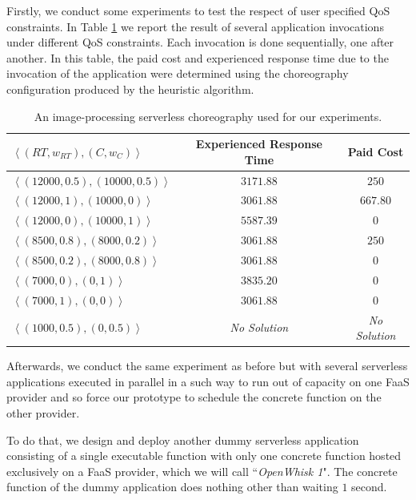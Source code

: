 \documentclass[12pt,a4paper]{report}
\newcommand{\ItalicQuotMark}[1]{``\textit{#1}"}
\begin{document}
Firstly, we conduct some experiments to test the respect of user specified QoS constraints. In Table \ref{tableTestQoS} we report the result of several application invocations under different QoS constraints. Each invocation is done sequentially, one after another. In this table, the paid cost and experienced response time due to the invocation of the application were determined using the choreography configuration produced by the heuristic algorithm.

\begin{table}
	\centering
	\begin{tabular}{l | c | c} 
		\toprule
		$\left\langle (RT,w_{RT}),(C,w_{C}) \right\rangle$ & Experienced Response Time & Paid Cost \\
		\midrule	
		$\left\langle (12000,0.5),(10000,0.5) \right\rangle$ & $3171.88$ & $250$ \\ 
		\hline
		$\left\langle (12000,1),(10000,0) \right\rangle$ & $3061.88$ & $667.80$ \\ 
		\hline
		$\left\langle (12000,0),(10000,1) \right\rangle$ & $5587.39$ & $0$ \\
		\hline
		$\left\langle (8500,0.8),(8000,0.2) \right\rangle$ & $3061.88$ & $250$ \\
		\hline
		$\left\langle (8500,0.2),(8000,0.8) \right\rangle$ & $3061.88$ & $0$ \\
		\hline
		$\left\langle (7000,0),(0,1) \right\rangle$ & $3835.20$ & $0$ \\
		\hline
		$\left\langle (7000,1),(0,0) \right\rangle$ & $3061.88$ & $0$ \\
		\hline
		$\left\langle (1000,0.5),(0,0.5) \right\rangle$ & \textit{No Solution} & \textit{No Solution} \\
		\bottomrule	
	\end{tabular}
	\caption{An image-processing serverless choreography used for our experiments.}
	\label{tableTestQoS}
\end{table}

Afterwards, we conduct the same experiment as before but with several serverless applications executed in parallel in a such way to run out of capacity on one FaaS provider and so force our prototype to schedule the concrete function on the other provider.

To do that, we design and deploy another dummy serverless application consisting of a single executable function with only one concrete function hosted exclusively on a FaaS provider, which we will call \ItalicQuotMark{OpenWhisk 1}. The concrete function of the dummy application does nothing other than waiting $1$ second.
\end{document}
